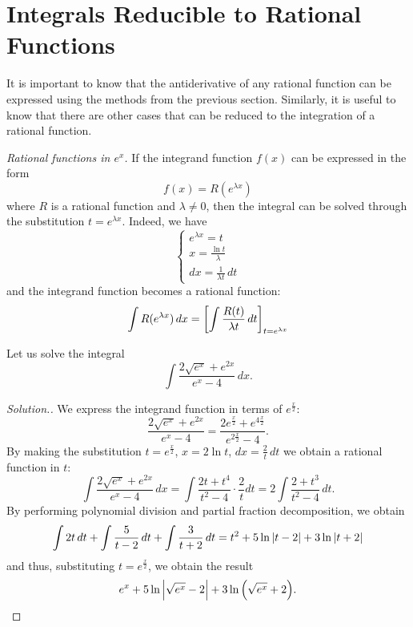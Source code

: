 \section{Integrals Reducible to Rational Functions}

It is important to know that the antiderivative of any rational function can be
expressed using the methods from the previous section. Similarly, it is useful
to know that there are other cases that can be reduced to the integration of a
rational function.

\emph{Rational functions in $e^x$.}
If the integrand function $f(x)$ can be expressed in the form
\[
  f(x) = R(e^{\lambda x})
\]
where $R$ is a rational function and $\lambda\neq 0$,
then the integral can be solved through the substitution $t = e^{\lambda x}$.
Indeed, we have
\[
\begin{cases}
 e^{\lambda x} = t\\
 x = \frac{\ln t}{\lambda}\\
 dx = \frac{1}{\lambda t}\, dt
 \end{cases}
\]
and the integrand function becomes a rational function:
\[
 \int R(e^{\lambda x})\, dx = {\left[ \int \frac{R(t)}{\lambda t}\, dt \right]}_{t=e^{\lambda x}}
\]

\begin{example}
Let us solve the integral
\[
  \int \frac{2\sqrt{e^x} + e^{2x}}{e^x-4}\, dx.
\]
\end{example}
\begin{proof}[Solution.]
We express the integrand function in terms of $e^{\frac x 2}$:
\[
  \frac{2\sqrt{e^x} + e^{2x}}{e^x-4}
  =\frac{2e^{\frac x 2}+e^{4\frac x 2}}{e^{2\frac x 2}-4}.
\]
By making the substitution $t=e^{\frac x 2}$, $x=2\ln t$, $dx=\frac 2 t\, dt$
we obtain a rational function in $t$:
\[
  \int \frac{2\sqrt{e^x} + e^{2x}}{e^x-4}\, dx
  = \int \frac{2t + t^4}{t^2-4}\cdot \frac 2 t dt
  = 2\int \frac{2+t^3}{t^2-4}\, dt.
\]
By performing polynomial division and partial fraction decomposition, we obtain
\[
 \int 2t\, dt + \int \frac{5}{t-2}\, dt + \int \frac{3}{t+2}\, dt
 = t^2 + 5\ln{\left|t-2\right|} + 3\ln{\left|t+2\right|}
\]
and thus, substituting $t=e^{\frac x 2}$, we obtain the result
\[
 e^x + 5 \ln {\left|\sqrt{e^x}-2\right|} + 3 \ln{\left( \sqrt{e^x}+2 \right)}.
\]
\end{proof}

